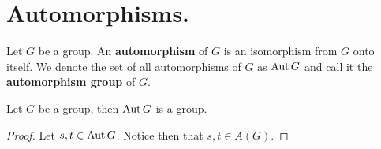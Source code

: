 \section{Automorphisms.}

\begin{definition}
    Let $G$ be a group. An \textbf{automorphism} of $G$ is an isomorphism from
    $G$ onto itself. We denote the set of all automorphisms of $G$ as $\operatorname{Aut}{G}$
    and call it the \textbf{automorphism group} of $G$.
\end{definition}

\begin{lemma}\label{4.4.1}
    Let $G$ be a group, then  $\operatorname{Aut}{G}$ is a group.
\end{lemma}
\begin{proof}
    Let $s,t \in \operatorname{Aut}{G}$. Notice then that $s,t \in A(G)$.
\end{proof}

